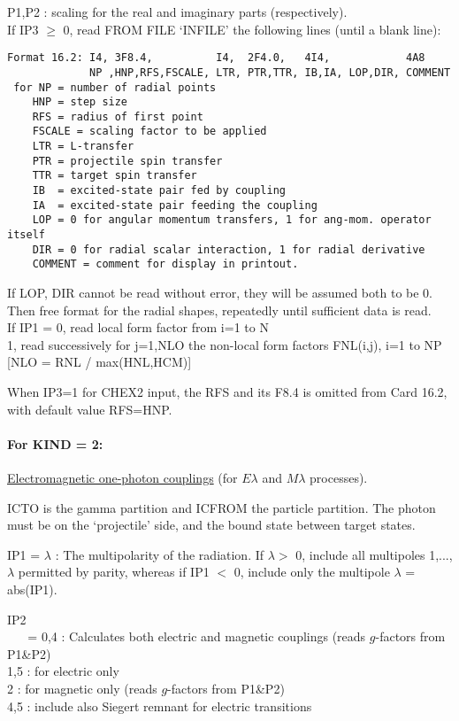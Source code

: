\documentclass[11pt]{article}
\begin{document}
\begin{description}
 P1,P2 : scaling for the real and imaginary parts (respectively).\\

   If IP3 $\geq$  0, read FROM FILE `INFILE'  the following lines
   (until a blank line):
\begin{verbatim}
Format 16.2: I4, 3F8.4,          I4,  2F4.0,   4I4,            4A8
             NP ,HNP,RFS,FSCALE, LTR, PTR,TTR, IB,IA, LOP,DIR, COMMENT
 for NP = number of radial points
    HNP = step size
    RFS = radius of first point
    FSCALE = scaling factor to be applied
    LTR = L-transfer
    PTR = projectile spin transfer
    TTR = target spin transfer
    IB  = excited-state pair fed by coupling
    IA  = excited-state pair feeding the coupling
    LOP = 0 for angular momentum transfers, 1 for ang-mom. operator itself
    DIR = 0 for radial scalar interaction, 1 for radial derivative
    COMMENT = comment for display in printout.
\end{verbatim}
If LOP, DIR cannot be read without error, they will be assumed both to be 0.\\
 Then free format for the radial shapes, repeatedly until sufficient data is read.\\


 If IP1 =
      0, read local form factor from i=1 to N
\\  1, read successively for j=1,NLO the non-local form factors
 FNL(i,j), i=1 to NP   [NLO = RNL / max(HNL,HCM)]


When IP3=1 for CHEX2 input, the RFS and its F8.4 is omitted from Card 16.2,
with default value RFS=HNP.


\paragraph{For KIND = 2:}
\underline{Electromagnetic one-photon couplings} (for $E\lambda$ and
$M\lambda$ processes).



 ICTO is the gamma partition and ICFROM the particle partition.
 The photon must be on the `projectile' side, and the bound state between
 target states.

 IP1 = $\lambda$ : The multipolarity of the radiation.
 If $\lambda >$ 0, include all multipoles 1,...,$\lambda$
permitted by parity, whereas if IP1 $<$ 0, include only the multipole
$\lambda$ = abs(IP1).
%

IP2\\
~ ~   = 0,4 : Calculates both electric and magnetic couplings
(reads $g$-factors from P1\&P2)
\\    1,5 : for electric only
\\    2 : for magnetic only (reads $g$-factors from P1\&P2)
\\    4,5 : include also Siegert remnant for electric transitions



\end{description}
\end{document}
